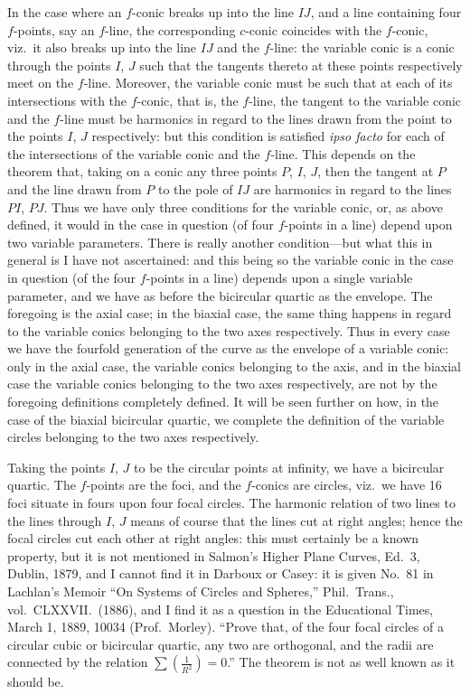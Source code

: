 \documentclass[11pt,a4paper]{book}
\begin{document}
In the case where an $f$-conic breaks up into the line $IJ$, and a line containing four $f$-points, say an $f$-line, the corresponding $c$-conic coincides with the $f$-conic, viz.\ it also breaks up into the line $IJ$ and the $f$-line: the variable conic is a conic through the points $I$, $J$ such that the tangents thereto at these points respectively meet on the $f$-line. Moreover, the variable conic must be such that at each of its intersections with the $f$-conic, that is, the $f$-line, the tangent to the variable conic and the $f$-line must be harmonics in regard to the lines drawn from the point to the points $I$, $J$ respectively: but this condition is satisfied \emph{ipso facto} for each of the intersections of the variable conic and the $f$-line. This depends on the theorem that, taking on a conic any three points $P$, $I$, $J$, then the tangent at $P$ and the line drawn from $P$ to the pole of $IJ$ are harmonics in regard to the lines $PI$, $PJ$. Thus we have only three conditions for the variable conic, or, as above defined, it would in the case in question (of four $f$-points in a line) depend upon two variable parameters. There is really another condition---but what this in general is I have not ascertained: and this being so the variable conic in the case in question (of the four $f$-points in a line) depends upon a single variable parameter, and we have as before the bicircular quartic as the envelope. The foregoing is the axial case; in the biaxial case, the same thing happens in regard to the variable conics belonging to the two axes respectively. Thus in every case we have the fourfold generation of the curve as the envelope of a variable conic: only in the axial case, the variable conics belonging to the axis, and in the biaxial case the variable conics belonging to the two axes respectively, are not by the foregoing definitions completely defined. It will be seen further on how, in the case of the biaxial bicircular quartic, we complete the definition of the variable circles belonging to the two axes respectively.

Taking the points $I$, $J$ to be the circular points at infinity, we have a bicircular quartic. The $f$-points are the foci, and the $f$-conics are circles, viz.\ we have 16 foci situate in fours upon four focal circles. The harmonic relation of two lines to the lines through $I$, $J$ means of course that the lines cut at right angles; hence the focal circles cut each other at right angles: this must certainly be a known property, but it is not mentioned in Salmon's Higher Plane Curves, Ed.\ 3, Dublin, 1879, and I cannot find it in Darboux or Casey: it is given No.\ 81 in Lachlan's Memoir ``On Systems of Circles and Spheres,'' Phil.\ Trans., vol.\ CLXXVII.\ (1886), and I find it as a question in the Educational Times, March 1, 1889, 10034 (Prof.\ Morley). ``Prove that, of the four focal circles of a circular cubic or bicircular quartic, any two are orthogonal, and the radii are connected by the relation $\sum(\frac{1}{R^2}) = 0$.'' The theorem is not as well known as it should be.
\end{document}
